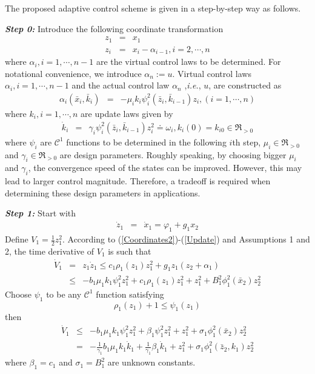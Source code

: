 \documentclass{tSYS2e}
\theoremstyle{plain}
\theoremstyle{definition}
\begin{document}
The proposed adaptive control scheme is given in a step-by-step way as
follows.

\textbf{\emph{Step 0:}} Introduce the following coordinate transformation
\begin{eqnarray}
z_{1} &=&x_{1}  \label{Coordinates1} \\
z_{i} &=&x_{i}-\alpha _{i-1},i=2,\cdots ,n  \label{Coordinates2}
\end{eqnarray}
where $\alpha _{i},i=1,\cdots ,n-1$ are the virtual control laws to be determined.
For notational convenience, we introduce $\alpha_{n}:=u $.
Virtual control laws $\alpha _{i},i=1,\cdots ,n-1$ and the actual control law $\alpha_{n}$ ,{\it i.e.}, $u$,
are constructed as
\begin{eqnarray}
\alpha_{i}(\bar{x}_i, \bar{k}_i)&=&-\mu _{i}k_{i}\psi _{i}^{2}(\bar{z}_{i},\bar{k}
_{i-1})z_{i}, (i=1,\cdots ,n)  \label{Virtual}
\end{eqnarray}
where $k_{i},i=1,\cdots ,n$ are update laws given by
\begin{eqnarray}
\dot{k}_{i} &=&\gamma _{i}\psi _{i}^{2}(\bar{z}_{i},\bar{k}
_{i-1})z_{i}^{2}
\doteq\omega _{i}, k_{i}(0)=k_{i0}\in \Re _{>0}\label{Update}
\end{eqnarray}
where $\psi _{i}$ are $\mathcal{C}^{1}$ functions to be determined in the
following $i$th step, $\mu _{i}\in \Re _{>0}$ and $\gamma _{i}\in \Re _{>0}$ are design parameters.
Roughly speaking, by choosing bigger $\mu _{i}$ and $\gamma _{i}$, the convergence speed of the states can be improved.
However, this may lead to larger control magnitude. Therefore, a tradeoff is required when determining these design parameters in applications.

\textbf{\emph{Step 1:}} Start with
\begin{eqnarray}
\dot{z}_{1} &=&\dot{x}_{1}
=\varphi _{1}+g_{1}x_{2}
\label{z1dot}
\end{eqnarray}
Define $V_{1}=\frac{1}{2}z_{1}^{2}$. According to (\ref{Coordinates2})-(\ref{Update}) and Assumptions 1 and 2, the time derivative of $V_{1}$ is such that
\begin{eqnarray}
\dot{V}_{1} &=&z_{1}\dot{z}_{1}
\leq c_{1}\rho _{1}(z_{1})z_{1}^{2}+g_{1}z_{1}(z_{2}+\alpha _{1})  \nonumber \\
&\leq &-b_{1}\mu _{1}k_{1}\psi _{1}^{2}z_{1}^{2}+c_{1}\rho
_{1}(z_{1})z_{1}^{2}+z_{1}^{2}+B_{1}^{2}\phi _{1}^{2}(\bar{x}_{2})z_{2}^{2}\label{V1dot0}
\end{eqnarray}
Choose $\psi _{1}$ to be any $\mathcal{C}^{1}$ function satisfying
\begin{equation}
\rho _{1}(z_{1})+1\leq \psi _{1}(z_{1})  \label{Psi1}
\end{equation}
then
\begin{eqnarray}
\dot{V}_{1} &\leq &-b_{1}\mu _{1}k_{1}\psi _{1}^{2}z_{1}^{2}+\beta _{1}\psi
_{1}^{2}z_{1}^{2}+z_{1}^{2}+\sigma _{1}\phi _{1}^{2}(\bar{x}_{2})z_{2}^{2}
\nonumber \\
&=&-\frac{1}{\gamma _{1}}b_{1}\mu _{1}k_{1}\dot{k}_{1}+\frac{1}{\gamma _{1}}
\beta _{1}\dot{k}_{1}+z_{1}^{2}+\sigma _{1}\phi _{1}^{2}(\bar{z}
_{2},k_1)z_{2}^{2}  \label{V1dot}
\end{eqnarray}
where $\beta _{1} =c_{1}$ and $\sigma _{1} =B_{1}^{2}$
are unknown constants.
\end{document}

